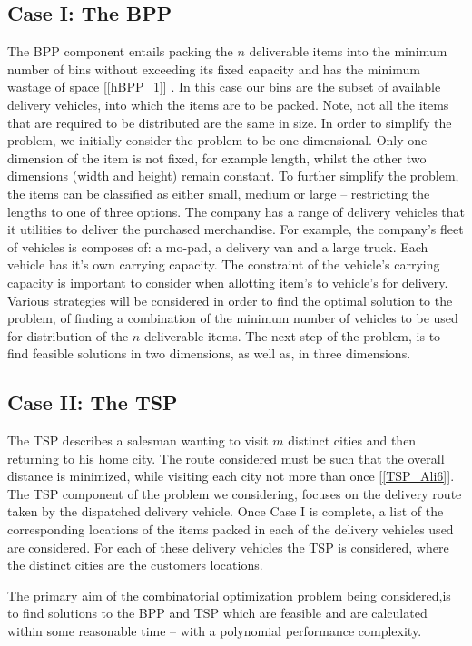 \subsection{Case I: The BPP}
The BPP component entails packing the $n$ deliverable items into the minimum number of bins without exceeding its fixed capacity and has the minimum wastage of space [\ref{hBPP_1}] . In this case our bins are the subset of available delivery vehicles, into which the items are to be packed. Note, not all the items that are required to be distributed are the same in size. In order to simplify the problem, we initially consider the problem to be one dimensional. Only one dimension of the item is not fixed, for example length, whilst the other two dimensions (width and height) remain constant. To further simplify the problem, the items can be classified as either small, medium or large – restricting the lengths to one of three options. The company has a range of delivery vehicles that it utilities to deliver the purchased merchandise. For example, the company's fleet of vehicles is composes of: a mo-pad, a delivery van and a large truck. Each vehicle has it's own carrying capacity. The constraint of the vehicle's carrying capacity is important to consider when allotting item's to vehicle's for delivery. Various strategies will be considered in order to find the optimal solution to the problem, of finding a combination of the minimum number of vehicles to be used for distribution of the $n$ deliverable items. The next step of the problem, is to find feasible solutions in two dimensions, as well as, in three dimensions.  

\subsection{Case II: The TSP}
The TSP describes a salesman wanting to visit $m$ distinct cities and then returning to his home city. The route considered must be such that the overall distance is minimized, while visiting each city not more than once [\ref{TSP_Ali6}]. The TSP component of the problem we considering, focuses on the delivery route taken by the dispatched delivery vehicle. Once Case I is complete, a list of the corresponding locations of the items packed in each of the delivery vehicles used are considered. For each of these delivery vehicles the TSP is considered, where the distinct cities are the customers locations. 

The primary aim of the combinatorial optimization problem being considered,is to find solutions to the BPP and TSP which are feasible and are calculated within some reasonable time – with a polynomial performance complexity. 